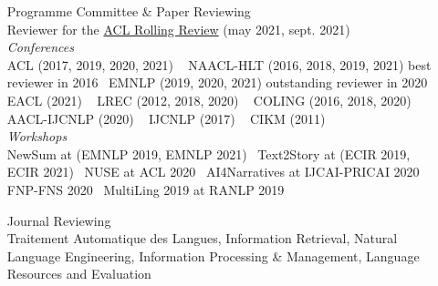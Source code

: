\documentclass[11pt,a4paper]{article}
\begin{document}
\begin{itemize}
\begin{itemize}[
font=\normalfont\bfseries,
itemsep=.1cm,
wide=0cm,
labelsep*=.1cm]
\item[Programme Committee \& Paper Reviewing] ~\\[.2em]
  Reviewer for the \href{https://aclrollingreview.org/}{ACL Rolling Review} (may 2021, sept. 2021)\\[.2em]
  \textit{Conferences} \\[.2em]
  \hspace*{1em} ACL (2017, 2019, 2020, 2021) ~\newline
  \hspace*{1em} NAACL-HLT (2016, 2018, 2019, 2021) \hfill best reviewer in 2016~\newline
  \hspace*{1em} EMNLP (2019, 2020, 2021) \hfill outstanding reviewer in 2020~\newline
  \hspace*{1em} EACL (2021) ~\newline
  \hspace*{1em} LREC (2012, 2018, 2020) ~\newline
  \hspace*{1em} COLING (2016, 2018, 2020) ~\newline
  \hspace*{1em} AACL-IJCNLP (2020) ~\newline
  \hspace*{1em} IJCNLP (2017) ~\newline
  \hspace*{1em} CIKM (2011) \\[.5em]
  \textit{Workshops} \\[.2em]
  \hspace*{1em} NewSum at (EMNLP 2019, EMNLP 2021)~\newline
  \hspace*{1em} Text2Story at (ECIR 2019, ECIR 2021)~\newline
  \hspace*{1em} NUSE at ACL 2020~\newline
  \hspace*{1em} AI4Narratives at IJCAI-PRICAI 2020~\newline
  \hspace*{1em} FNP-FNS 2020~\newline
  \hspace*{1em} MultiLing 2019 at RANLP 2019~\newline

\item[Journal Reviewing]~\\[.2em]
    Traitement Automatique des Langues, 
    Information Retrieval, 
    Natural Language Engineering, 
    Information Processing \& Management,
    Language Resources and Evaluation
    

\end{itemize}
\end{itemize}
\end{document}
